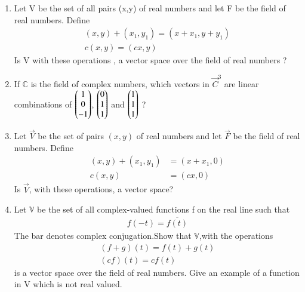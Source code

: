 \renewcommand{\theequation}{\theenumi}
\renewcommand{\thefigure}{\theenumi}
\begin{enumerate}[label=\thesubsection.\arabic*.,ref=\thesubsection.\theenumi]
%
\item Let V be the set of all pairs (x,y) of real numbers and let F be the field of real numbers. Define 
\begin{align}
(x,y)+(x_1,y_1)=(x+x_1,y+y_1)\\
c(x,y)=(cx,y)
\end{align}
Is V with these operations , a vector space over the field of real numbers ?
%
\\
\solution

%
\item If $\mathbb{C}$ is the field of complex numbers, which vectors in $\vec{C}^{3}$ are linear combinations of $\begin{pmatrix}1\\0\\-1\end{pmatrix}$, $\begin{pmatrix}0\\1\\1\end{pmatrix}$ and $\begin{pmatrix}1\\1\\1\end{pmatrix}$ ?
%
\\
\solution

\item Let $\vec{V}$ be the  set of pairs $(x,y)$ of real numbers and let $\vec{F}$ be the field of real numbers. Define
\begin{align}
    (x,y)+(x_1,y_1) &= (x+x_1,0) \label{eq:solutions/2/1/7/eq:eq1}\\
    c(x,y) &= (cx,0)
\end{align}
Is $\vec{V}$, with these operations, a vector space?
\\
\solution

%
\item    Let $\mathbb{V}$ be the set of all complex-valued functions f on the real line such that
   \begin{align}f(-t)=\overline{f(t)}\end{align}The bar denotes complex conjugation.Show that $\mathbb{V}$,with the operations\begin{align}(f+g)(t)=f(t)+g(t)\\(cf)(t)=cf(t)\end{align} is a vector space over the field of real numbers. Give an example of a function in V which is not real valued.
\\
\solution

%
\end{enumerate}


